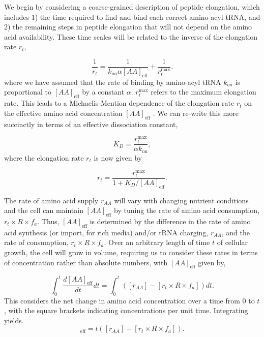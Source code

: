 We begin by considering a coarse-grained description of peptide elongation,
which includes 1) the time required to find and bind each correct amino-acyl
tRNA, and 2) the remaining steps in peptide elongation that will not depend on
the amino acid availability. These time scales will be related to the inverse of the
elongation rate $r_t$,

\begin{equation}
\frac{1}{r_t} = \frac{1}{k_{on} \alpha [AA]_{\text{eff}}} + \frac{1}{r_{t}^{\text{max}}}.
\end{equation}
where we have assumed that the rate of binding by amino-acyl tRNA $k_{on}$ is
proportional to $[AA]_{\text{eff}}$ by a constant $\alpha$. $r_{t}^{\text{max}}$
refers to the maximum elongation rate. This leads to a Michaelis-Mention
dependence of the elongation rate $r_t$ on the effective amino acid
concentration $[AA]_{\text{eff}}$ \citep{klumpp2013, dai2016}.
We can re-write this more succinctly in terms of an effective dissociation
constant,

\begin{equation}
    K_D = \frac{r_{t}^{\text{max}}}{\alpha k_\text{on}},
\end{equation}
where the elongation rate $r_t$ is now given by

\begin{equation}
r_t = \frac{r_{t}^{\text{max}}}{1 + K_D/[AA]_{\text{eff}}}.
\label{eq:rt_kd_simple}
\end{equation}

The rate of amino acid supply $r_{AA}$ will vary with changing nutrient
conditions and the cell can maintain $[AA]_{\text{eff}}$ by tuning the rate of
amino acid consumption, $r_t \times R \times f_a$.  Thus, $[AA]_{\text{eff}}$ is
determined by the difference in the rate of amino acid synthesis (or import, for
rich media) and/or tRNA charging,  $r_{AA}$, and the rate of consumption,
$r_t\times R \times f_a$. Over an  arbitrary length of time $t$ of cellular
growth, the cell will grow in volume, requiring us to consider these rates in
terms of concentration rather than absolute numbers, with $[AA]_{\text{eff}}$
given by,

\begin{equation}
\int_{0}^{t} \frac{d[AA]_{\text{eff}}}{dt} dt =  \int_{0}^{t}([r_{AA}] - [r_t\times R \times f_a]) dt.
\label{eq:aaeff_int}
\end{equation}
This considers the net change in amino acid concentration over a time from 0 to
$t$, with the square brackets indicating concentrations per unit time.
Integrating  yields.
\begin{equation}
[AA]_{\text{eff}} =  t([r_{AA}] - [r_t \times R \times f_a]).
\label{eq:aaeff_concs}
\end{equation}

